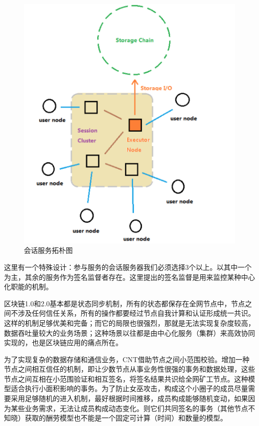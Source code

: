\documentclass[a4paper,12pt]{article}
\begin{document}
\begin {figure} [htbp]
\centering \includegraphics [width = 5in] {pic_cn/c5.png}
\caption {会话服务拓朴图} \label {fig: c5}
\end {figure}

这里有一个特殊设计：参与服务的会话服务器我们必须选择3个以上。以其中一个为主，其余的服务作为签名监督者存在。这里提出的签名监督是用来监控某种中心化职能的机制。

区块链1.0和2.0基本都是状态同步机制，所有的状态都保存在全网节点中，节点之间不涉及任何信任关系，所有的操作都要经过节点自我计算和认证形成统一共识。这样的机制足够优美和完备；而它的局限也很强烈，那就是无法实现复杂度较高，数据吞吐量较大的业务场景；这种场景以往都是由中心化服务（集群）来高效协同实现的，也是区块链应用的痛点所在。

为了实现复杂的数据存储和通信业务，CNT借助节点之间小范围校验。增加一种节点之间相互信任的机制，即让少数节点从事业务性很强的事务和数据处理，这些节点之间互相在小范围验证和相互签名，将签名结果共识给全网矿工节点。这种模型适合执行小面积影响的事务。为了防止女巫攻击，构成这个小圈子的成员尽量需要采用足够随机的进入机制，最好根据时间推移，成员构成能够随机变动，如果因为某些业务需求，无法让成员构成动态变化。则它们共同签名的事务（其他节点不知晓）获取的酬劳模型也不能是一个固定可计算（时间）和数量的模型。
\end{document}
